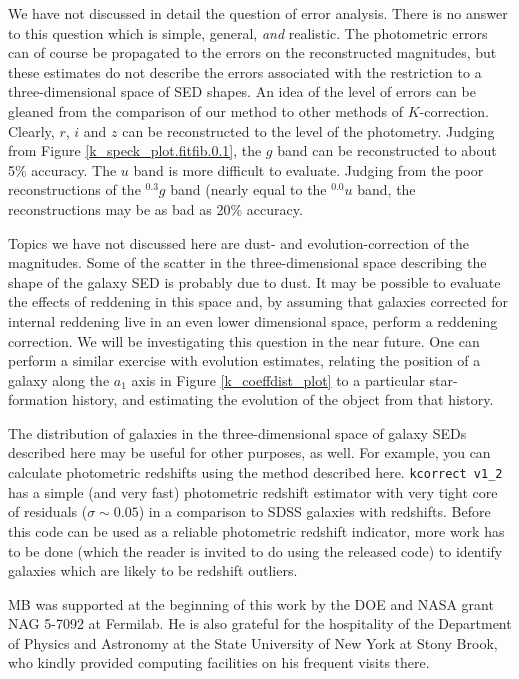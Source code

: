 \documentclass[10pt,preprint]{aastex}
\newcommand{\band}[2]{\ensuremath{^{#1}\!{#2}}}
\begin{document}
We have not discussed in detail the question of error analysis. There
is no answer to this question which is simple, general, {\it and}
realistic. The photometric errors can of course be propagated to the
errors on the reconstructed magnitudes, but these estimates do not
describe the errors associated with the restriction to a
three-dimensional space of SED shapes. An idea of the level of errors
can be gleaned from the comparison of our method to other methods of
$K$-correction. Clearly, $r$, $i$ and $z$ can be reconstructed to the
level of the photometry. Judging from Figure
\ref{k_speck_plot.fitfib.0.1}, the $g$ band can be reconstructed to
about 5\% accuracy. The $u$ band is more difficult to evaluate.
Judging from the poor reconstructions of the $\band{0.3}{g}$ band
(nearly equal to the $\band{0.0}{u}$ band, the reconstructions may be
as bad as 20\% accuracy.

Topics we have not discussed here are dust- and evolution-correction
of the magnitudes. Some of the scatter in the three-dimensional space
describing the shape of the galaxy SED is probably due to dust. It may
be possible to evaluate the effects of reddening in this space and, by
assuming that galaxies corrected for internal reddening live in an
even lower dimensional space, perform a reddening correction. We will
be investigating this question in the near future. One can perform a
similar exercise with evolution estimates, relating the position of a
galaxy along the $a_1$ axis in Figure \ref{k_coeffdist_plot} to a
particular star-formation history, and estimating the evolution of the
object from that history.

The distribution of galaxies in the three-dimensional space of galaxy
SEDs described here may be useful for other purposes, as well. For
example, you can calculate photometric redshifts using the method
described here. {\tt kcorrect v1\_2} has a simple (and very fast)
photometric redshift estimator with very tight core of residuals
($\sigma \sim 0.05$) in a comparison to SDSS galaxies with redshifts.
Before this code can be used as a reliable photometric redshift
indicator, more work has to be done (which the reader is invited to do
using the released code) to identify galaxies which are likely to be
redshift outliers. 

\acknowledgments

MB was supported at the beginning of this work by the DOE and NASA
grant NAG 5-7092 at Fermilab. He is also grateful for the hospitality
of the Department of Physics and Astronomy at the State University of
New York at Stony Brook, who kindly provided computing facilities on
his frequent visits there. 
\end{document}
